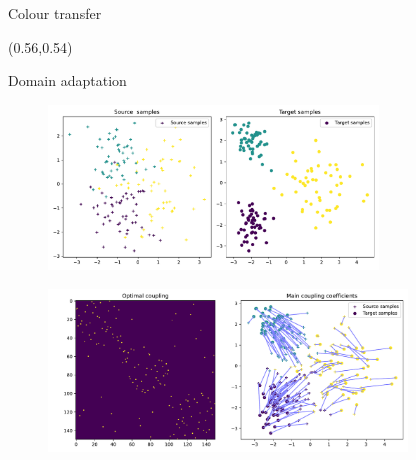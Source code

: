 \documentclass[pdf,aspectratio=169,10pt]{beamer}
\begin{document}
\begin{frame}{ Colour transfer}
\begin{textblock}{0.45}(0.56,0.54)
\small
{}
\end{textblock}
\end{frame}


\begin{frame}{ Domain adaptation}

\begin{minipage}{0.49\textwidth}
\vspace{1em}
    \begin{figure}
        \includegraphics[width=0.78\textwidth]{../img/DA_original_samples.pdf}
    \end{figure}
\vspace{-0.5em}
    \begin{figure}
        \includegraphics[width=0.85\textwidth]{../img/DA_coupling.pdf}
    \end{figure}
    

\end{minipage}
\end{frame}
\end{document}
